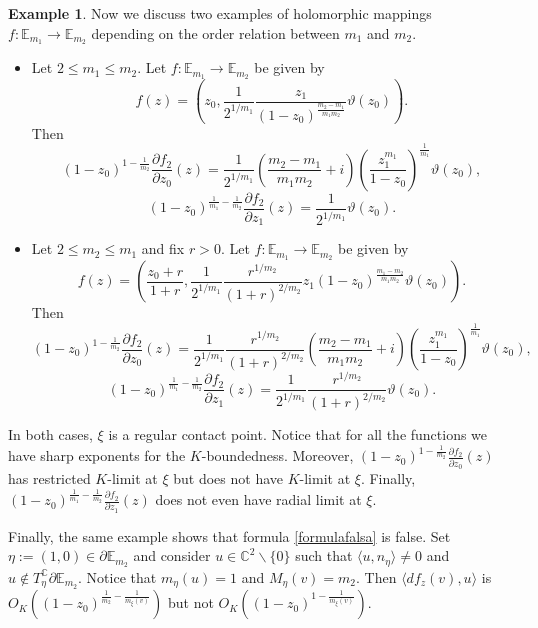 \documentclass[11pt, reqno]{amsart}
\numberwithin{equation}{section}
\theoremstyle{definition}
\newtheorem{example}[theorem]{Example}
\newcommand{\C}{\mathbb{C}}
\begin{document}
{{{\begin{example}
			Now we discuss two examples of holomorphic mappings $f\colon \mathbb{E}_{m_1}\to \mathbb{E}_{m_2}$ depending on the  order relation between $m_1$ and $m_2$.
			\begin{itemize}
				\item Let $2\leq m_1\leq m_2$. Let $f\colon \mathbb{E}_{m_1}\to \mathbb{E}_{m_2}$ be given by
				$$f(z)=\left(z_0,\frac{1}{2^{1/m_1}}\frac{z_1}{(1-z_0)^\frac{m_2-m_1}{m_1m_2}}\vartheta(z_0)\right).$$
				Then
				$$(1-z_0)^{1-\frac{1}{m_2}}\frac{\partial f_2}{\partial z_0}(z)=\frac{1}{2^{1/m_1}}\left(\frac{m_2-m_1}{m_1m_2}+i\right)\left(\frac{z_1^{m_1}}{1-z_0}\right)^\frac{1}{m_1}\vartheta(z_0),$$
				$$(1-z_0)^{\frac{1}{m_1}-\frac{1}{m_2}}\frac{\partial f_2}{\partial z_1}(z)=\frac{1}{2^{1/m_1}}\vartheta(z_0).$$
				\item Let $2\leq m_2\leq m_1$ and fix $r>0$. Let $f\colon \mathbb{E}_{m_1}\to \mathbb{E}_{m_2}$ be given by
				$$f(z)=\left(\frac{z_0+r}{1+r},\frac{1}{2^{1/m_1}}\frac{r^{1/m_2}}{(1+r)^{2/m_2}}z_1(1-z_0)^\frac{m_1-m_2}{m_1m_2}\vartheta(z_0)\right).$$
				Then
				$$(1-z_0)^{1-\frac{1}{m_2}}\frac{\partial f_2}{\partial z_0}(z)=\frac{1}{2^{1/m_1}}\frac{r^{1/m_2}}{(1+r)^{2/m_2}}\left(\frac{m_2-m_1}{m_1m_2}+i\right)\left(\frac{z_1^{m_1}}{1-z_0}\right)^\frac{1}{m_1}\vartheta(z_0),$$
				$$(1-z_0)^{\frac{1}{m_1}-\frac{1}{m_2}}\frac{\partial f_2}{\partial z_1}(z)=\frac{1}{2^{1/m_1}}\frac{r^{1/m_2}}{(1+r)^{2/m_2}}\vartheta(z_0).$$
			\end{itemize}	
			In both cases, $\xi$ is a regular contact point. Notice that for all the functions we have sharp exponents for the $K$-boundedness. Moreover, $(1-z_0)^{1-\frac{1}{m_2}}\frac{\partial f_2}{\partial z_0}(z)$ has restricted $K$-limit at $\xi$ but  does not  have $K$-limit at $\xi$.
			Finally, $(1-z_0)^{\frac{1}{m_1}-\frac{1}{m_2}}\frac{\partial f_2}{\partial z_1}(z)$ does not  even have radial limit at $\xi$.
			
			Finally, the same example shows that formula \eqref{formulafalsa}  is false.
			Set $\eta:=(1,0)\in\partial \mathbb{E}_{m_2}$ and consider $u\in\C^2\backslash\{0\}$ such that $\langle u,n_\eta\rangle\neq0$ and $u\notin T_\eta^\C\partial \mathbb{E}_{m_2}$. Notice that $m_\eta(u)=1$ and $M_\eta(v)=m_2$. Then
			$\langle df_z(v), u\rangle$ is 
			$O_K\left((1-z_0)^{\frac{1}{m_2}-\frac{1}{m_\xi(v)}}\right)$ but not 
			$O_K\left((1-z_0)^{1-\frac{1}{m_\xi(v)}}\right)$.
		\end{example}
		
		
		
}}}
\end{document}
